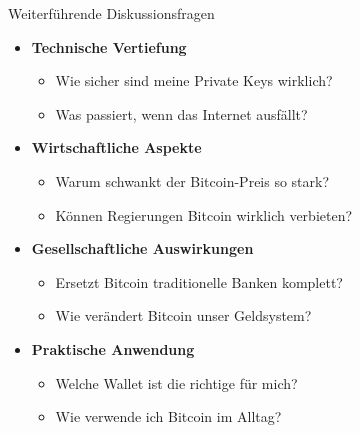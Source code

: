 \documentclass[aspectratio=169,t,11pt]{beamer}
\begin{document}
\begin{frame}{Weiterführende Diskussionsfragen}
	\begin{itemize}
		\item \textbf{Technische Vertiefung}
		      \begin{itemize}
			      \item Wie sicher sind meine Private Keys wirklich?
			      \item Was passiert, wenn das Internet ausfällt?
		      \end{itemize}

		\item \textbf{Wirtschaftliche Aspekte}
		      \begin{itemize}
			      \item Warum schwankt der Bitcoin-Preis so stark?
			      \item Können Regierungen Bitcoin wirklich verbieten?
		      \end{itemize}

		\item \textbf{Gesellschaftliche Auswirkungen}
		      \begin{itemize}
			      \item Ersetzt Bitcoin traditionelle Banken komplett?
			      \item Wie verändert Bitcoin unser Geldsystem?
		      \end{itemize}

		\item \textbf{Praktische Anwendung}
		      \begin{itemize}
			      \item Welche Wallet ist die richtige für mich?
			      \item Wie verwende ich Bitcoin im Alltag?
		      \end{itemize}
	\end{itemize}
\end{frame}
\end{document}
